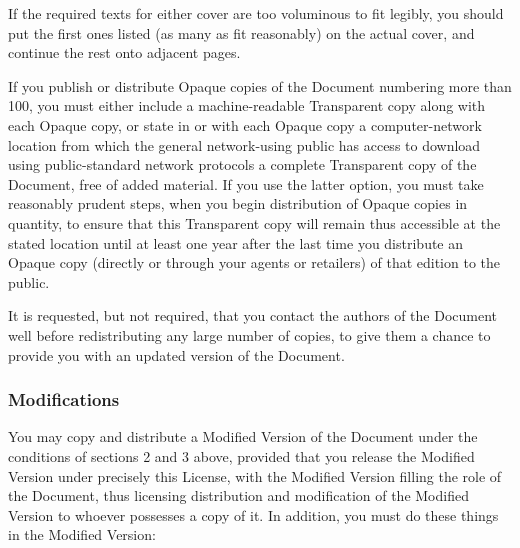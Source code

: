 If the required texts for either cover are too voluminous to fit legibly, you should put the first ones listed (as many as fit reasonably) on the actual cover, and continue the rest onto adjacent pages.

If you publish or distribute Opaque copies of the Document numbering more than 100, you must either include a machine-readable Transparent copy along with each Opaque copy, or state in or with each Opaque copy a computer-network location from which the general network-using public has access to download using public-standard network protocols a complete Transparent copy of the Document, free of added material. If you use the latter option, you must take reasonably prudent steps, when you begin distribution of Opaque copies in quantity, to ensure that this Transparent copy will remain thus accessible at the stated location until at least one year after the last time you distribute an Opaque copy (directly or through your agents or retailers) of that edition to the public.

It is requested, but not required, that you contact the authors of the Document well before redistributing any large number of copies, to give them a chance to provide you with an updated version of the Document.

\subsubsection{Modifications}

You may copy and distribute a Modified Version of the Document under the conditions of sections 2 and 3 above, provided that you release the Modified Version under precisely this License, with the Modified Version filling the role of the Document, thus licensing distribution and modification of the Modified Version to whoever possesses a copy of it. In addition, you must do these things in the Modified Version:

